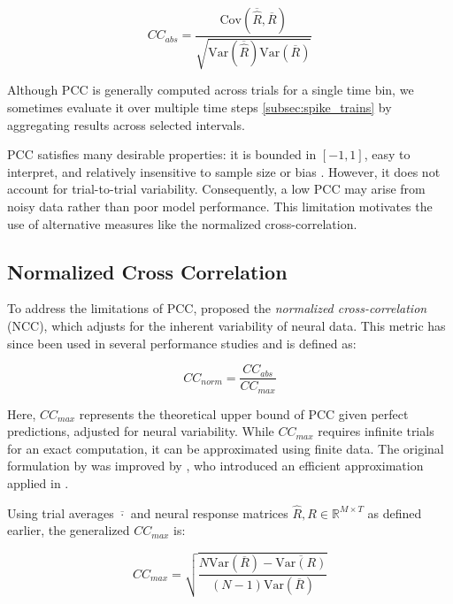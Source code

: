 \begin{equation}
    CC_{abs} = \frac{\text{Cov}(\overline{\hat{R}}, \overline{R})}
    {\sqrt{\text{Var}(\overline{\hat{R}})\text{Var}(\overline{R})}}
\end{equation}
\label{eq:cc_abs}

Although PCC is generally computed across trials for a single time bin, we sometimes evaluate it over multiple time steps \ref{subsec:spike_trains} by aggregating results across selected intervals.

PCC satisfies many desirable properties: it is bounded in $[-1, 1]$, easy to interpret, and relatively insensitive to sample size or bias \citep{Wang2023towards}. However, it does not account for trial-to-trial variability. Consequently, a low PCC may arise from noisy data rather than poor model performance. This limitation motivates the use of alternative measures like the normalized cross-correlation.

\subsection{Normalized Cross Correlation}
\label{subsec:normalized_cross_correlation}

To address the limitations of PCC, \citet{hsu_quantifying_2004} proposed the \emph{normalized cross-correlation} (NCC), which adjusts for the inherent variability of neural data. This metric has since been used in several performance studies \citet{touryan_spatial_2005, gill_sound_2006, Wang2023towards} and is defined as:

\begin{equation}
    CC_{norm} = \frac{CC_{abs}}{CC_{max}}
\end{equation}
\label{eq:normalized_cc}

Here, $CC_{max}$ represents the theoretical upper bound of PCC given perfect predictions, adjusted for neural variability. While $CC_{max}$ requires infinite trials for an exact computation, it can be approximated using finite data. The original formulation by \citet{hsu_quantifying_2004} was improved by \citet{schoppe_measuring_2016}, who introduced an efficient approximation applied in \citet{Wang2023towards}.

Using trial averages $\overline{\cdot}$ and neural response matrices $\hat{R}, R \in \mathbb{R}^{M \times T}$ as defined earlier, the generalized $CC_{max}$ is:

\begin{equation}
    CC_{max} = \sqrt{\frac{N\text{Var}(\overline{R}) - \overline{\text{Var}(R)}}{(N-1)\text{Var}(\overline{R})}}
\end{equation}
\label{eq:cc_max_general}

